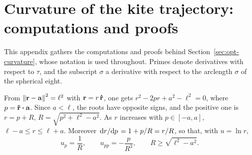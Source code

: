 \section{Curvature of the kite trajectory: computations and proofs} \label{app:curv}

This appendix gathers the computations and proofs behind Section~\ref{sec:opt-curvature}, whose notation is used throughout.
Primes denote derivatives with respect to \(\tau\), and the subscript \(\sigma\) a derivative with respect to the arclength \(\sigma\) of the spherical eight.

From \(\norm{\vb r - \vb a}^2 = \ell^2\) with \(\vb r = r\,\vu r\), one gets \(r^2 - 2pr + a^2 - \ell^2 = 0\), where \(p = \vu r \vdot \vb a\).
Since \(a<\ell\), the roots have opposite signs, and the positive one is \(r = p + R\), \(R = \sqrt{p^2+\ell^2-a^2}\).
As \(r\) increases with \(p\in[-a,a]\), \(\ell-a\le r\le\ell+a\).
Moreover \(\dv*{r}{p} = 1 + p/R = r/R\), so that, with \(u = \ln r\),
\begin{equation}
    u_p = \frac1R, \qquad u_{pp} = -\frac{p}{R^3}, \qquad R \ge \sqrt{\ell^2-a^2}.
\end{equation}


